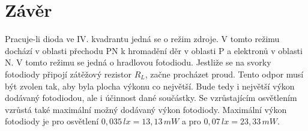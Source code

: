\documentclass[12pt]{article} %
\begin{document}
\section{Závěr}
Pracuje-li dioda ve IV. kvadrantu jedná se o režim zdroje. V tomto režimu dochází v oblasti přechodu PN k hromadění děr v oblasti P a elektronů v oblasti N. V tomto režimu se jedná o hradlovou fotodiodu. Jestliže se na svorky fotodiody připojí zátěžový rezistor $R_L$, začne procházet proud. Tento odpor musí být zvolen tak, aby byla plocha výkonu co největší. Bude tedy i největší výkon dodávaný fotodiodou, ale i účinnost dané součástky. Se vzrůstajícím osvětlením vzrůstá také maximální možný dodávaný výkon fotodiody. Maximální výkon fotodiody je pro osvětlení $0,035\,lx = 13,13\,mW$ a pro $0,07\,lx = 23,33\,mW$.
\end{document}
